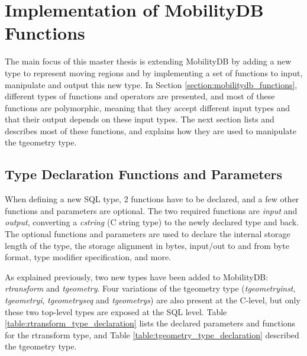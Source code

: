
\clearpage

\section{Implementation of MobilityDB Functions}
\label{section:general_functions}

The main focus of this master thesis is extending MobilityDB by adding a new type to represent moving regions and by implementing a set of functions to input, manipulate and output this new type. In Section \ref{section:mobilitydb_functions}, different types of functions and operators are presented, and most of these functions are polymorphic, meaning that they accept different input types and that their output depends on these input types. The next section lists and describes most of these functions, and explains how they are used to manipulate the tgeometry type.

\subsection{Type Declaration Functions and Parameters}
\label{section:type_declaration}

When defining a new SQL type, 2 functions have to be declared, and a few other functions and parameters are optional. The two required functions are \textit{input} and \textit{output}, converting a \textit{cstring} (C string type) to the newly declared type and back. The optional functions and parameters are used to declare the internal storage length of the type, the storage alignment in bytes, input/out to and from byte format, type modifier specification, and more.

As explained previously, two new types have been added to MobilityDB: \textit{rtransform} and \textit{tgeometry}. Four variations of the tgeometry type (\textit{tgeometryinst}, \textit{tgeometryi}, \textit{tgeometryseq} and \textit{tgeometrys}) are also present at the C-level, but only these two top-level types are exposed at the SQL level. Table \ref{table:rtransform_type_declaration} lists the declared parameters and functions for the rtransform type, and Table \ref{table:tgeometry_type_declaration} described the tgeometry type.


